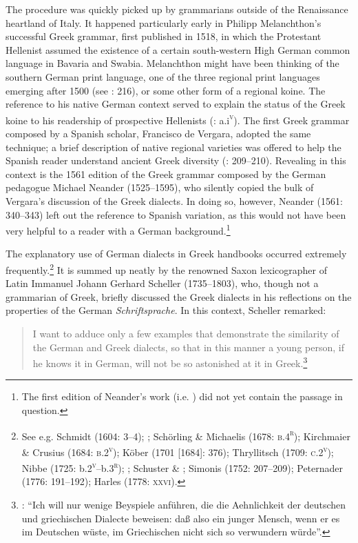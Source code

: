 The procedure was quickly picked up by grammarians outside of the Renaissance heartland of Italy. It happened particularly early in Philipp Melanchthon’s successful Greek grammar, first published in 1518, in which the Protestant Hellenist assumed the existence of a certain south-western High German common language in Bavaria and Swabia. Melanchthon might have been thinking of the southern German print language, one of the three regional print languages emerging after 1500 (see \citealt{Mattheier2003}: 216), or some other form of a regional koine. The reference to his native German context served to explain the status of the Greek koine to his readership of prospective Hellenists (\citealt{Melanchthon1518}: a.i\textsc{\textsuperscript{v}}). The first Greek grammar composed by a Spanish scholar, Francisco de Vergara, adopted the same technique; a brief description of native regional varieties was offered to help the Spanish reader understand ancient Greek diversity (\citealt{Vergara1537}: 209–210). Revealing in this context is the 1561 edition of the Greek grammar composed by the German pedagogue Michael Neander (1525–1595), who silently copied the bulk of Vergara’s discussion of the Greek dialects. In doing so, however, Neander (1561: 340–343) left out the reference to Spanish variation, as this would not have been very helpful to a reader with a German background.\footnote{The first edition of Neander’s work (i.e. \citealt{Neander1553}) did not yet contain the passage in question.}

The explanatory use of German dialects in Greek handbooks occurred extremely frequently.\footnote{See e.g. Schmidt (1604: 3–4); \citet[83]{Rhenius1626}; Schörling \& Michaelis (1678: \textsc{b.4}\textsc{\textsuperscript{r}}); Kirchmaier \& Crusius (1684: \textsc{b.2}\textsc{\textsuperscript{v}}); Köber (1701 [1684]: 376); Thryllitsch (1709: \textsc{c.2}\textsc{\textsuperscript{v}}); Nibbe (1725: b.2\textsc{\textsuperscript{v}}\textsc{–}b.3\textsc{\textsuperscript{r}}); \citet[141]{Georgi1733}; Schuster \& \citet[13]{Lauterbach1737}; Simonis (1752: 207–209); Peternader (1776: 191–192); Harles (1778: \textsc{xxvi}).} It is summed up neatly by the renowned Saxon lexicographer of Latin Immanuel Johann Gerhard Scheller (1735–1803), who, though not a grammarian of Greek, briefly discussed the Greek dialects in his reflections on the properties of the German \textit{Schriftsprache}. In this context, Scheller remarked:

\begin{quote}
I want to adduce only a few examples that demonstrate the similarity of the German and Greek dialects, so that in this manner a young person, if he knows it in German, will not be so astonished at it in Greek.\footnote{\citet[229]{Scheller1772}: “Ich will nur wenige Beyspiele anführen, die die Aehnlichkeit der deutschen und griechischen Dialecte beweisen: daß also ein junger Mensch, wenn er es im Deutschen wüste, im Griechischen nicht sich so verwundern würde”.}
\end{quote}

